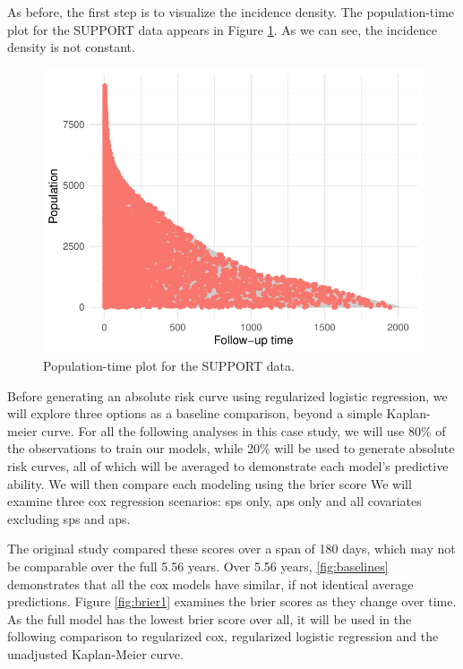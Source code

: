 \documentclass[
]{jss}
\begin{document}
As before, the first step is to visualize the incidence density. The
population-time plot for the SUPPORT data appears in Figure
\ref{fig:support-poptime}. As we can see, the incidence density is not
constant.

\begin{CodeChunk}
\begin{figure}

{\centering \includegraphics{../figures/support-poptime-1} 

}

\caption{\label{fig:support-poptime} Population-time plot for the SUPPORT data.}\label{fig:support-poptime}
\end{figure}
\end{CodeChunk}

Before generating an absolute risk curve using regularized logistic
regression, we will explore three options as a baseline comparison,
beyond a simple Kaplan-meier curve. For all the following analyses in
this case study, we will use 80\% of the observations to train our
models, while 20\% will be used to generate absolute risk curves, all of
which will be averaged to demonstrate each model's predictive ability.
We will then compare each modeling using the brier score
\citep{graf1999ass} We will examine three cox regression scenarios: sps
only, aps only and all covariates excluding sps and aps.

The original study compared these scores over a span of 180 days, which
may not be comparable over the full 5.56 years. Over 5.56 years,
\ref{fig:baselines} demonstrates that all the cox models have similar,
if not identical average predictions. Figure \ref{fig:brier1} examines
the brier scores as they change over time. As the full model has the
lowest brier score over all, it will be used in the following comparison
to regularized cox, regularized logistic regression and the unadjusted
Kaplan-Meier curve.
\end{document}
